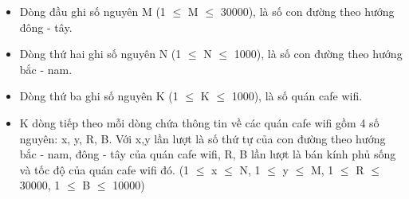 \begin{itemize}
	\item Dòng đầu ghi số nguyên M (1 $\le$ M $\le$ 30000), là số con đường theo hướng đông - tây.
	\item Dòng thứ hai ghi số nguyên N (1 $\le$ N $\le$ 1000), là số con đường theo hướng bắc - nam.
	\item Dòng thứ ba ghi số nguyên K (1 $\le$ K $\le$ 1000), là số quán cafe wifi.
	\item K dòng tiếp theo mỗi dòng chứa thông tin về các quán cafe wifi gồm 4 số nguyên: x, y, R, B. Với x,y lần lượt là số thứ tự của con đường theo hướng bắc - nam, đông - tây của quán cafe wifi, R, B lần lượt là bán kính phủ sống và tốc độ của quán cafe wifi đó. (1 $\le$ x $\le$ N, 1 $\le$ y $\le$ M, 1 $\le$ R $\le$ 30000, 1 $\le$ B $\le$ 10000)
\end{itemize}

\